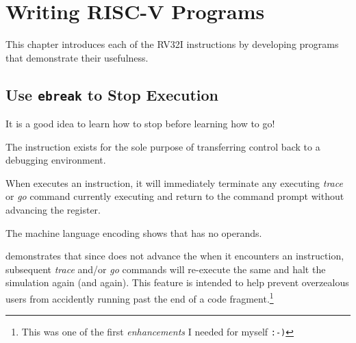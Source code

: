 \chapter{Writing RISC-V Programs}

%
This chapter introduces each of the RV32I instructions by developing programs 
that demonstrate their usefulness.


\section{Use {\tt ebreak} to Stop \rvddt{} Execution}
\label{uguide:ebreak}

It is a good idea to learn how to stop before learning how to go!

The  instruction exists for the sole purpose of transferring control back 
to a debugging environment.\cite[p.~24]{rvismv1v22:2017}

When \rvddt{} executes an  instruction, it will immediately terminate any
executing {\em trace} or {\em go} command currently executing and return to the
command prompt without advancing the  register.  

The machine language encoding shows that  has no operands.


 demonstrates that since \rvddt{} does 
not advance the  when it encounters an  instruction, 
subsequent {\em trace} and/or {\em go} commands will re-execute the same  
and halt the simulation again (and again).  
This feature is intended to help prevent overzealous users from accidently 
running past the end of a code fragment.\footnote{This was one of the first {\em enhancements}
I needed for myself \tt:-)}




